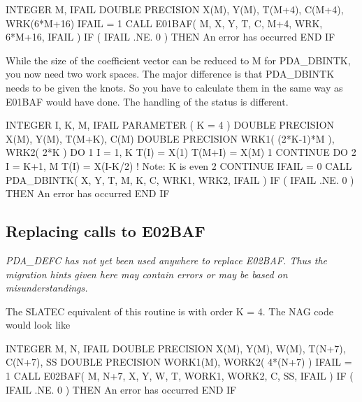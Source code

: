 \documentclass[11pt,twoside,nolof]{starlink}
\begin{document}
\begin{terminalv}
      INTEGER M, IFAIL
      DOUBLE PRECISION X(M), Y(M), T(M+4), C(M+4), WRK(6*M+16)
      IFAIL = 1
      CALL E01BAF( M, X, Y, T, C, M+4, WRK, 6*M+16, IFAIL )
      IF ( IFAIL .NE. 0 ) THEN
         An error has occurred
      END IF
\end{terminalv}

   While the size of the coefficient vector can be reduced to M for
   PDA\_DBINTK, you now need two work spaces.
   The major difference is that PDA\_DBINTK needs to be given the knots. So
   you have to calculate them in the same way as E01BAF would have done.
   The handling of the status is different.

\begin{terminalv}
      INTEGER I, K, M, IFAIL
      PARAMETER ( K = 4 )
      DOUBLE PRECISION X(M), Y(M), T(M+K), C(M)
      DOUBLE PRECISION WRK1( (2*K-1)*M ), WRK2( 2*K )
      DO 1 I = 1, K
         T(I)   = X(1)
         T(M+I) = X(M)
    1 CONTINUE
      DO 2 I = K+1, M
         T(I) = X(I-K/2)      ! Note: K is even
    2 CONTINUE
      IFAIL = 0
      CALL PDA_DBINTK( X, Y, T, M, K, C, WRK1, WRK2, IFAIL )
      IF ( IFAIL .NE. 0 ) THEN
         An error has occurred
      END IF
\end{terminalv}


\subsection{\label{m_e02baf}Replacing calls to E02BAF}

\emph{PDA\_DEFC has not yet been used anywhere to replace E02BAF. Thus the
   migration hints given here may contain errors or may be based on
   misunderstandings.
\/}

   The SLATEC equivalent of this routine is
   with order K = 4. The
   NAG code would look like

\begin{terminalv}
      INTEGER M, N, IFAIL
      DOUBLE PRECISION X(M), Y(M), W(M), T(N+7), C(N+7), SS
      DOUBLE PRECISION WORK1(M), WORK2( 4*(N+7) )
      IFAIL = 1
      CALL E02BAF( M, N+7, X, Y, W, T, WORK1, WORK2, C, SS, IFAIL )
      IF ( IFAIL .NE. 0 ) THEN
         An error has occurred
      END IF
\end{terminalv}
\end{document}
